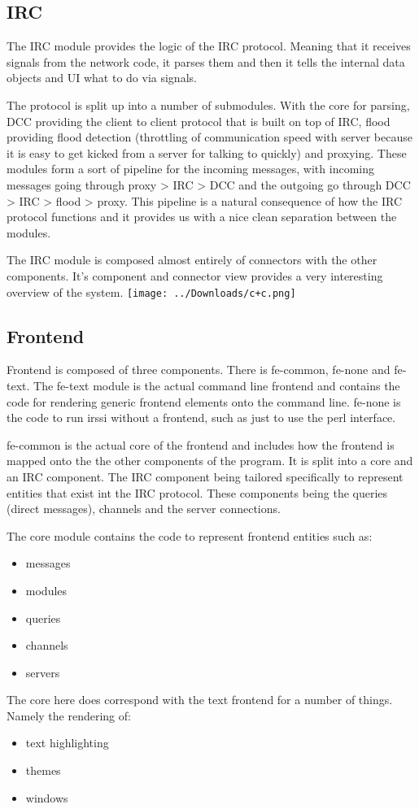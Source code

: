 \documentclass{acm_proc_article-sp}
\begin{document}
\subsection{IRC}

The IRC module provides the logic of the IRC protocol. Meaning that it receives signals from the network code, it parses them and then it tells the internal data objects and UI what to do via signals.

The protocol is split up into a number of submodules. With the core for parsing, DCC providing the client to client protocol that is built on top of IRC, flood providing flood detection (throttling of communication speed with server because it is easy to get kicked from a server for talking to quickly) and proxying. These modules form a sort of pipeline for the incoming messages, with incoming messages going through proxy > IRC > DCC and the outgoing go through DCC > IRC > flood > proxy. This pipeline is a natural consequence of how the IRC protocol functions and it provides us with a nice clean separation between the modules.

The IRC module is composed almost entirely of connectors with the other components. It's component and connector view provides a very interesting overview of the system.
\texttt{[image: ../Downloads/c+c.png]} 

\subsection{Frontend}

Frontend is composed of three components. There is fe-common, fe-none and fe-text. The fe-text module is the actual command line frontend and contains the code for rendering generic frontend elements onto the command line. fe-none is the code to run irssi without a frontend, such as just to use the perl interface.

fe-common is the actual core of the frontend and includes how the frontend is mapped onto the the other components of the program. It is split into a core and an IRC component. The IRC component being tailored specifically to represent entities that exist int the IRC protocol. These components being the queries (direct messages), channels and the server connections.

The core module contains the code to represent frontend entities such as:
\begin{itemize}

	\item messages
	\item modules
	\item queries
	\item channels
	\item servers

\end{itemize}
The core here does correspond with the text frontend for a number of things. Namely the rendering of:
\begin{itemize}
	\item text highlighting
	\item themes
	\item windows
\end{itemize}
\end{document}
